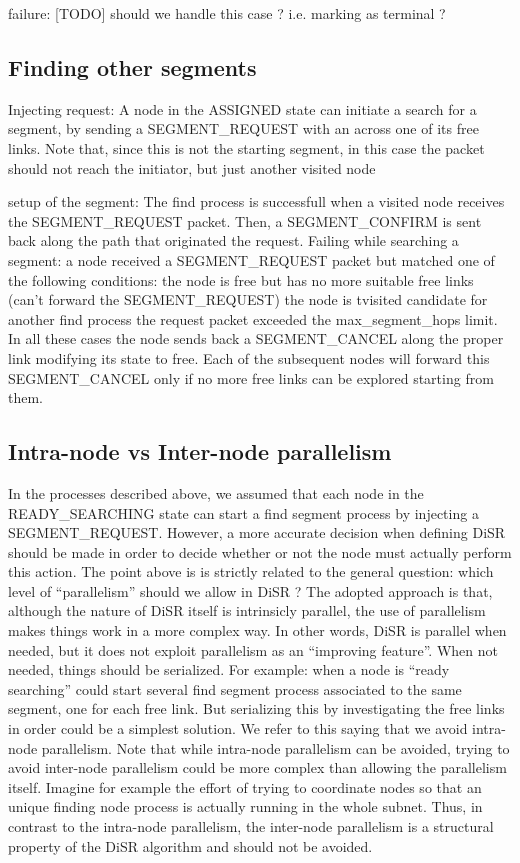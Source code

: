 \documentclass[conference]{IEEEtran}
\begin{document}
failure: [TODO] should we handle this case ? i.e.
marking as terminal ?

\subsection{Finding other segments}

Injecting request: A node in the ASSIGNED state can initiate a search for a
segment, by sending a SEGMENT\_REQUEST with an across one of its free
links. Note that, since this is not the starting segment, in this case
the packet should not reach the initiator, but just another visited
node

setup of the segment: The find process is successfull when a visited
node receives the SEGMENT\_REQUEST packet. Then, a SEGMENT\_CONFIRM is
sent back along the path that originated the request.  Failing while
searching a segment: a node received a SEGMENT\_REQUEST packet but
matched one of the following conditions: the node is free but has no
more suitable free links (can’t forward the SEGMENT\_REQUEST) the node
is tvisited candidate for another find process the request packet
exceeded the max\_segment\_hops limit.  In all these cases the node
sends back a SEGMENT\_CANCEL along the proper link modifying its state
to free. Each of the subsequent nodes will forward this SEGMENT\_CANCEL
only if no more free links can be explored starting from them.


\subsection{Intra-node vs Inter-node parallelism}
In the processes described above, we assumed that each node in the
READY\_SEARCHING state can start a find segment process by injecting a
SEGMENT\_REQUEST. However, a more accurate decision when defining DiSR
should be made in order to decide whether or not the node must
actually perform this action. 
The point above is is strictly related to the general question: which
level of “parallelism” should we allow in DiSR ? The adopted approach
is that, although the nature of DiSR itself is intrinsicly parallel,
the use of parallelism makes things work in a more complex way. In
other words, DiSR is parallel when needed, but it does not exploit
parallelism as an “improving feature”. When not needed, things should
be serialized. For example: when a node is “ready searching” could
start several find segment process associated to the same segment, one
for each free link. But serializing this by investigating the free
links in order could be a simplest solution. We refer to this saying
that we avoid intra-node parallelism.  Note that while intra-node
parallelism can be avoided, trying to avoid inter-node parallelism
could be more complex than allowing the parallelism itself. Imagine
for example the effort of trying to coordinate nodes so that an unique
finding node process is actually running in the whole subnet. Thus, in
contrast to the intra-node parallelism, the inter-node parallelism is
a structural property of the DiSR algorithm and should not be avoided.
\end{document}
